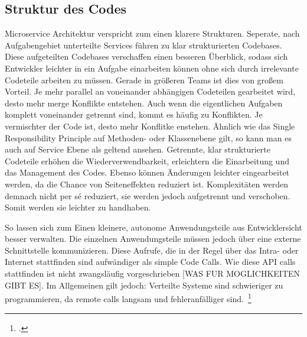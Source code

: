\subsection{Struktur des Codes}
Microservice Architektur verspricht zum einen klarere Strukturen. Seperate, nach Aufgabengebiet unterteilte Services führen zu klar strukturierten Codebases. Diese aufgeteilten Codebases verschaffen einen besseren Überblick, sodass sich Entwickler leichter in ein Aufgabe einarbeiten können ohne sich durch irrelevante Codeteile arbeiten zu müssen. Gerade in größeren Teams ist dies von großem Vorteil. Je mehr parallel an voneinander abhängigen Codeteilen gearbeitet wird, desto mehr merge Konflikte entstehen. Auch wenn die eigentlichen Aufgaben komplett voneinander getrennt sind, kommt es häufig zu Konflikten. Je vermischter der Code ist, desto mehr Konflitke enstehen. Ähnlich wie das Single Responsibility Principle auf Methoden- oder Klassenebene gilt, so kann man es auch auf Service Ebene als geltend ansehen. Getrennte, klar strukturierte Codeteile erhöhen die Wiederverwendbarkeit, erleichtern die Einarbeitung und das Management des Codes. Ebenso können Änderungen leichter eingearbeitet werden, da die Chance von Seiteneffekten reduziert ist. Komplexitäten werden demnach nicht per sé reduziert, sie werden jedoch aufgetrennt und verschoben. Somit werden sie leichter zu handhaben.

So lassen sich zum Einen kleinere, autonome Anwendungsteile aus Entwicklersicht besser verwalten. Die einzelnen Anwendungsteile müssen jedoch über eine externe Schnittstelle kommunizieren. Diese Aufrufe, die in der Regel über das Intra- oder Internet stattfinden sind aufwändiger als simple Code Calls. Wie diese API calls stattfinden ist nicht zwangsläufig vorgeschrieben [WAS FUR MOGLICHKEITEN GIBT ES]. Im Allgemeinen gilt jedoch: Verteilte Systeme sind schwieriger zu programmieren, da remote calls langsam und fehleranfälliger sind.~\footcite[vgl.][]{Fowler:Guide}

